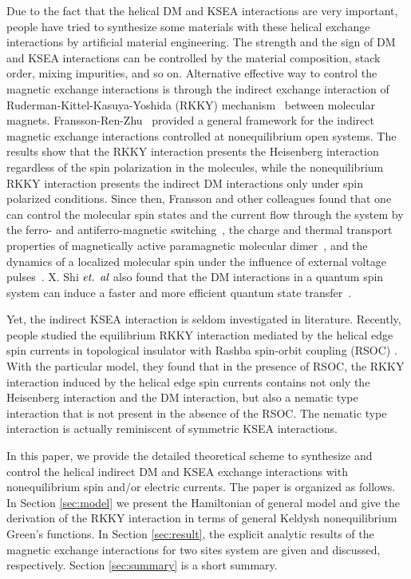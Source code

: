 \documentclass[aps,prb,twocolumn,showpacs,amssymb]{revtex4-1}
\begin{document}
Due to the fact that the helical DM and KSEA interactions are very important, people have tried to synthesize some materials with these helical exchange interactions by artificial material engineering. The strength and the sign of DM and KSEA interactions can be controlled by the material composition, stack order, mixing impurities, and so on.
Alternative effective way to control the magnetic exchange interactions is through the indirect exchange interaction of Ruderman-Kittel-Kasuya-Yoshida (RKKY) mechanism~\cite{Ruderman1954,Kasuya1956,Yosida1957} between molecular magnets.
Fransson-Ren-Zhu~\cite{Ren2014} provided a general framework for the indirect magnetic exchange interactions controlled at nonequilibrium open systems.
The results show that the RKKY interaction presents the Heisenberg interaction regardless of the spin polarization in the molecules, while the nonequilibrium RKKY interaction presents the indirect DM interactions only under spin polarized conditions.
Since then, Fransson and other colleagues %
found that one can control the molecular spin states and the current flow through the system by the ferro- and antiferro-magnetic switching~\cite{TSJ2016}, the
charge and thermal transport properties of magnetically active paramagnetic molecular dimer~\cite{JD2017}, and the dynamics of a localized molecular spin under the influence of external voltage pulses~\cite{HH2018}. X. Shi $\emph{et. al}$ also found that the DM interactions in a quantum spin system can induce a faster and more efficient quantum state transfer~\cite{XS2017}.

Yet, the indirect KSEA interaction is seldom investigated in literature.
Recently, people \cite{Lee2015,Shiranzaei2017} studied the equilibrium RKKY interaction mediated by the helical edge spin currents in topological insulator \cite{Hasan2010,Qi2011} with Rashba spin-orbit coupling (RSOC) \cite{Rashba1960,Bychkov1984}. With the particular model, they found that in the presence of RSOC, the RKKY interaction induced by the helical edge spin currents contains not only the Heisenberg interaction and the DM interaction, but also a nematic type interaction that is not present in the absence of the RSOC. The nematic type interaction is actually reminiscent of symmetric KSEA interactions.

In this paper, we provide the detailed theoretical scheme to synthesize and control the helical indirect DM and KSEA exchange interactions with nonequilibrium spin and/or electric currents.
The paper is organized as follows. In Section \ref{sec:model} we present the Hamiltonian
of general model and give the derivation of the RKKY interaction in terms of general Keldysh nonequilibrium Green's functions. In Section \ref{sec:result}, the explicit analytic results of the magnetic exchange interactions for two sites system are given and discussed, respectively. Section \ref{sec:summary} is a short summary.
\end{document}
